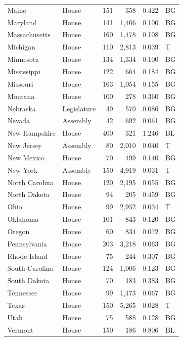 \begin{table}[h]
\begin{tabular}{llrrrl}
Maine        & House        & 151 & 358   & 0.422 & BG \\
Maryland     & House        & 141 & 1{,}406 & 0.100 & BG \\
Massachusetts & House       & 160 & 1{,}478 & 0.108 & BG \\
Michigan     & House        & 110 & 2{,}813 & 0.039 & T \\
Minnesota    & House        & 134 & 1{,}334 & 0.100 & BG \\
Mississippi  & House        & 122 & 664   & 0.184 & BG \\
Missouri     & House        & 163 & 1{,}054 & 0.155 & BG \\
Montana      & House        & 100 & 278   & 0.360 & BG \\
Nebraska     & Legislature  & 49  & 570   & 0.086 & BG \\
Nevada       & Assembly     & 42  & 692   & 0.061 & BG \\
New Hampshire & House       & 400 & 321   & 1.246 & BL \\
New Jersey   & Assembly     & 80  & 2{,}010 & 0.040 & T \\
New Mexico   & House        & 70  & 499   & 0.140 & BG \\
New York     & Assembly     & 150 & 4{,}919 & 0.031 & T \\
North Carolina & House      & 120 & 2{,}195 & 0.055 & BG \\
North Dakota & House        & 94  & 205   & 0.459 & BG \\
Ohio         & House        & 99  & 2{,}952 & 0.034 & T \\
Oklahoma     & House        & 101 & 843   & 0.120 & BG \\
Oregon       & House        & 60  & 834   & 0.072 & BG \\
Pennsylvania & House        & 203 & 3{,}218 & 0.063 & BG \\
Rhode Island & House        & 75  & 244   & 0.307 & BG \\
South Carolina & House      & 124 & 1{,}006 & 0.123 & BG \\
South Dakota & House        & 70  & 183   & 0.383 & BG \\
Tennessee    & House        & 99  & 1{,}473 & 0.067 & BG \\
Texas        & House        & 150 & 5{,}265 & 0.028 & T \\
Utah         & House        & 75  & 588   & 0.128 & BG \\
Vermont      & House        & 150 & 186   & 0.806 & BL \\

\end{tabular}
\end{table}
